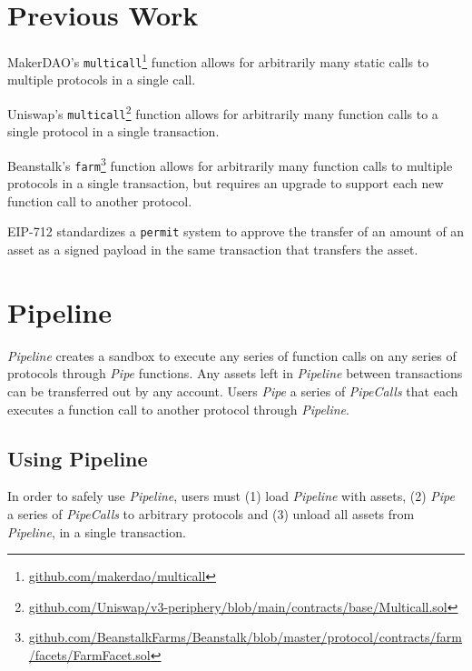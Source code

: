 \documentclass[tikz]{article}
\newcommand{\code}[1]{\texttt{#1}}
\newcommand{\term}[1]{\textsl{#1}}
\newcommand{\fref}[1]{\footnote{\href{http://#1}{#1}}}
\begin{document}
\section{Previous Work}
MakerDAO's \code{multicall}\fref{github.com/makerdao/multicall} function allows for arbitrarily many static calls to multiple protocols in a single call. 

Uniswap's \code{multicall}\fref{github.com/Uniswap/v3-periphery/blob/main/contracts/base/Multicall.sol} function allows for arbitrarily many function calls to a single protocol in a single transaction.

Beanstalk's \code{farm}\fref{github.com/BeanstalkFarms/Beanstalk/blob/master/protocol/contracts/farm/facets/FarmFacet.sol} function allows for arbitrarily many function calls to multiple protocols in a single transaction, but requires an upgrade to support each new function call to another protocol.

EIP-712 standardizes a \code{permit} system to approve the transfer of an amount of an asset as a signed payload in the same transaction that transfers the asset.

\newpage
\section{Pipeline}
\term{Pipeline} creates a sandbox to execute any series of function calls on any series of protocols through \term{Pipe} functions. Any assets left in \term{Pipeline} between transactions can be transferred out by any account. Users \term{Pipe} a series of \term{PipeCalls} that each executes a function call to another protocol through \term{Pipeline}. 

\subsection{Using Pipeline}
In order to safely use \term{Pipeline}, users must (1) load \term{Pipeline} with assets, (2) \term{Pipe} a series of \term{PipeCalls} to arbitrary protocols and (3) unload all assets from \term{Pipeline}, in a single transaction.
\end{document}
